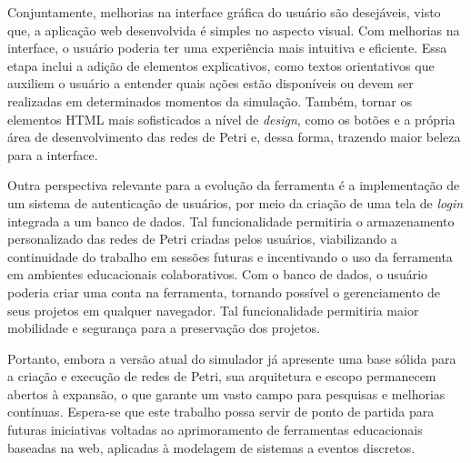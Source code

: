 \documentclass[
	12pt,				%
	openright,			%
	oneside,			%
	a4paper,			%
	english,			%
	brazil				%
	]{abntex2}
\theoremstyle{doispontos}
\begin{document}
Conjuntamente, melhorias na interface gráfica do usuário são desejáveis, visto que, a aplicação web desenvolvida é simples no aspecto visual. Com melhorias na interface, o usuário poderia ter uma experiência mais intuitiva e eficiente. Essa etapa inclui a adição de elementos explicativos, como textos orientativos que auxiliem o usuário a entender quais ações estão disponíveis ou devem ser realizadas em determinados momentos da simulação. Também, tornar os elementos HTML mais sofisticados a nível de \textit{design}, como os botões e a própria área de desenvolvimento das redes de Petri e, dessa forma, trazendo maior beleza para a interface.

Outra perspectiva relevante para a evolução da ferramenta é a implementação de um sistema de autenticação de usuários, por meio da criação de uma tela de \textit{login} integrada a um banco de dados. Tal funcionalidade permitiria o armazenamento personalizado das redes de Petri criadas pelos usuários, viabilizando a continuidade do trabalho em sessões futuras e incentivando o uso da ferramenta em ambientes educacionais colaborativos. Com o banco de dados, o usuário poderia criar uma conta na ferramenta, tornando possível o gerenciamento de seus projetos em qualquer navegador. Tal funcionalidade permitiria maior mobilidade e segurança para a preservação dos projetos. 

Portanto, embora a versão atual do simulador já apresente uma base sólida para a criação e execução de redes de Petri, sua arquitetura e escopo permanecem abertos à expansão, o que garante um vasto campo para pesquisas e melhorias contínuas. Espera-se que este trabalho possa servir de ponto de partida para futuras iniciativas voltadas ao aprimoramento de ferramentas educacionais baseadas na web, aplicadas à modelagem de sistemas a eventos discretos.





\end{document}
